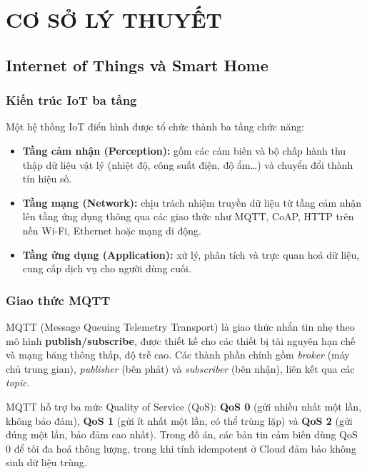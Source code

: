 \documentclass[13pt,a4paper]{report}
\begin{document}
\chapter{CƠ SỞ LÝ THUYẾT}
\label{ch:cosoly}

\section{Internet of Things và Smart Home}

\subsection{Kiến trúc IoT ba tầng}

Một hệ thống IoT điển hình được tổ chức thành ba tầng chức năng:

\begin{itemize}
  \item \textbf{Tầng cảm nhận (Perception):} gồm các cảm biến và bộ chấp hành thu
        thập dữ liệu vật lý (nhiệt độ, công suất điện, độ ẩm\dots) và chuyển đổi
        thành tín hiệu số.
  \item \textbf{Tầng mạng (Network):} chịu trách nhiệm truyền dữ liệu từ tầng cảm
        nhận lên tầng ứng dụng thông qua các giao thức như MQTT, CoAP, HTTP trên
        nền Wi-Fi, Ethernet hoặc mạng di động.
  \item \textbf{Tầng ứng dụng (Application):} xử lý, phân tích và trực quan hoá dữ
        liệu, cung cấp dịch vụ cho người dùng cuối.
\end{itemize}

\subsection{Giao thức MQTT}

MQTT (Message Queuing Telemetry Transport) là giao thức nhắn tin nhẹ theo mô hình
\textbf{publish/subscribe}, được thiết kế cho các thiết bị tài nguyên hạn chế và
mạng băng thông thấp, độ trễ cao. Các thành phần chính gồm \textit{broker} (máy
chủ trung gian), \textit{publisher} (bên phát) và \textit{subscriber} (bên nhận),
liên kết qua các \textit{topic}.

MQTT hỗ trợ ba mức Quality of Service (QoS): \textbf{QoS 0} (gửi nhiều nhất một
lần, không bảo đảm), \textbf{QoS 1} (gửi ít nhất một lần, có thể trùng lặp) và
\textbf{QoS 2} (gửi đúng một lần, bảo đảm cao nhất). Trong đồ án, các bản tin cảm
biến dùng QoS 0 để tối đa hoá thông lượng, trong khi tính idempotent ở Cloud đảm
bảo không sinh dữ liệu trùng.
\end{document}
